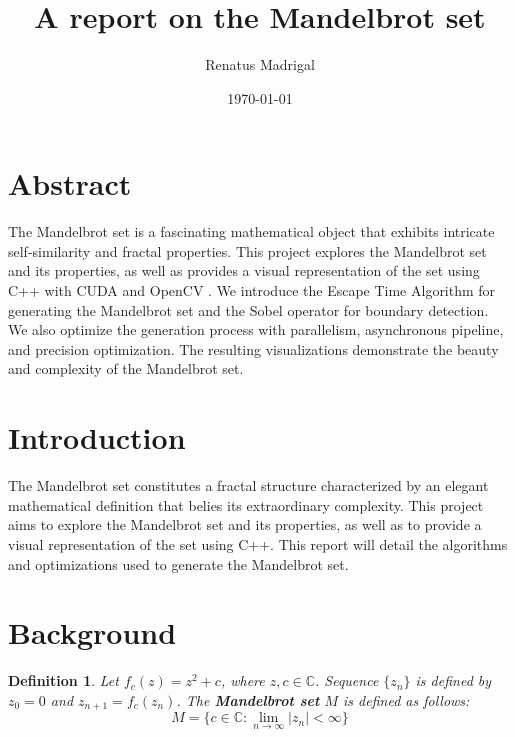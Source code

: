 \documentclass[11pt]{article}
\title{A report on the Mandelbrot set}
\author{Renatus Madrigal}
\date{\today}
\newtheorem{definition}{Definition}
\begin{document}
    \maketitle


    \section{Abstract}\label{sec:abstract}

    The Mandelbrot set is a fascinating mathematical object that exhibits intricate self-similarity and fractal
    properties.
    This project explores the Mandelbrot set and its properties, as well as provides a visual representation of the set
    using C++ with CUDA and OpenCV .
    We introduce the Escape Time Algorithm for generating the Mandelbrot set and the Sobel operator for boundary
    detection.
    We also optimize the generation process with parallelism, asynchronous pipeline, and precision optimization.
    The resulting visualizations demonstrate the beauty and complexity of the Mandelbrot set.


    \section{Introduction}\label{sec:introduction}

    The Mandelbrot set constitutes a fractal structure characterized by an elegant mathematical definition that belies
    its extraordinary complexity.
    This project aims to explore the Mandelbrot set and its properties, as well as to provide a visual representation of
    the set using C++.
    This report will detail the algorithms and optimizations used to generate the Mandelbrot set.


    \section{Background}\label{sec:background}

    \begin{definition}
        Let $f_c(z) = z^2 + c$, where $z, c \in \mathbb{C}$.
        Sequence $\{z_n\}$ is defined by $z_0 = 0$ and $z_{n+1} = f_c(z_n)$.
        The \textbf{Mandelbrot set} $M$ is defined as follows:
        \begin{equation}
            M = \{c \in \mathbb{C} : \lim_{n \to \infty} |z_n| < \infty\}\label{eq:mandelbrot_set_define}
        \end{equation}
    \end{definition}
\end{document}
